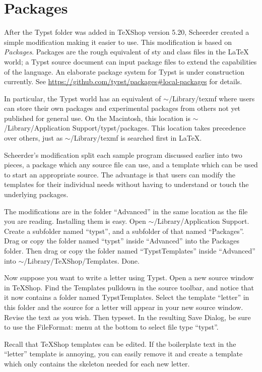 \documentclass[11pt, oneside]{article}   	%
\begin{document}
\section{Packages}

After the Typst folder was added in TeXShop version 5.20, Scheerder created a simple modification making it  easier to use. This modification is based on {\em Packages}.
Packages are the rough equivalent of sty and class files in the LaTeX world; a Typst source document can input package files to extend the capabilities of the language.  An elaborate package system for Typst is under construction currently. See \url{https://github.com/typst/packages#local-packages} for details.

In particular, the Typst world has an equivalent of $\sim$/Library/texmf where users can store their own packages and experimental packages from others not yet published for general use. On the Macintosh, this location is 
$\sim$/Library/Application Support/typst/packages.   
This location takes precedence over others, just as $\sim$/Library/texmf is searched first in LaTeX.

Scheerder's modification split each sample program discussed earlier into two pieces, a package which any source file can use, and a template which can be used to start an appropriate source. The advantage is that users can modify the templates for their individual needs without having to understand or touch the underlying packages. 

The modifications are in the folder ``Advanced'' in the same location as the file you are reading. Installing them is easy. Open $\sim$/Library/Application Support.
Create a subfolder named ``typst'', and a subfolder of that named ``Packages''. Drag or copy the folder named ``typst''
inside ``Advanced'' into the Packages folder. Then drag or copy the folder named ``TypstTemplates'' inside
``Advanced'' into $\sim$/Library/TeXShop/Templates. Done.

Now suppose you want to write a letter using Typst. Open a new source window in TeXShop. Find the Templates pulldown in the source toolbar, and notice that it now contains a folder named TypstTemplates. Select the template ``letter'' in this folder and the source for a letter will appear in your new source window. Revise the text as you wish. Then typeset. In the resulting Save Dialog, be sure to use the FileFormat: menu at the bottom to select file type ``typst''. 

Recall that TeXShop templates can be edited. If the boilerplate text in the ``letter'' template is annoying, you can easily remove it and create a template which only contains the skeleton needed for each new letter.
\end{document}
